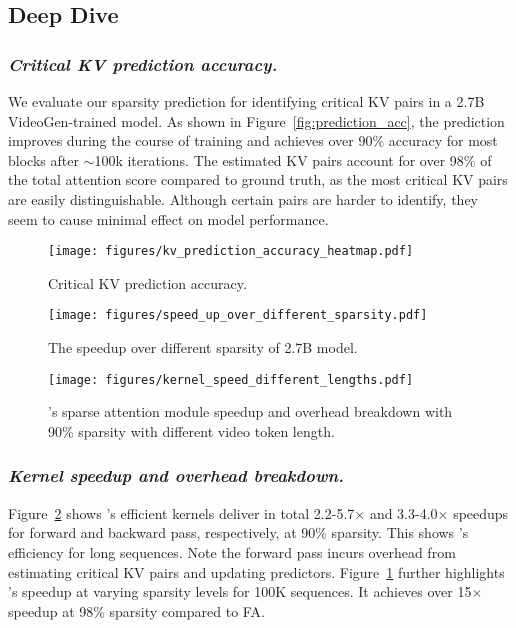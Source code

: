 \subsection{Deep Dive}


\subsubsection{\bf \em Critical KV prediction accuracy.} We evaluate our sparsity prediction for identifying critical KV pairs in a 2.7B VideoGen-trained model. As shown in Figure~\ref{fig:prediction_acc}, the prediction improves during the course of training and achieves over 90\% accuracy for most blocks after $\sim$100k iterations. 
The estimated KV pairs account for over 98\% of the total attention score compared to ground truth, as the most critical KV pairs are easily distinguishable. Although certain pairs are harder to identify, they seem to cause minimal effect on model performance.


\begin{figure}[t]
    \centering
    \begin{minipage}[t]{0.25\textwidth}
       \centering
  \texttt{[image: figures/kv\_prediction\_accuracy\_heatmap.pdf]}
\caption{Critical KV prediction accuracy.}
  \label{fig:prediction_acc} 
    \end{minipage}
    \hfill
    \hspace{-0.1in}
    \begin{minipage}[t]{0.215\textwidth}
      \centering
  \texttt{[image: figures/speed\_up\_over\_different\_sparsity.pdf]} 
  \caption{The speedup over different sparsity of 2.7B model.}
  \label{fig:speed_up_different_sparsity} 
    \end{minipage}
   
\end{figure}

\begin{figure}[t]
  \centering
  \texttt{[image: figures/kernel\_speed\_different\_lengths.pdf]} 
\caption{\sys's sparse attention module speedup and overhead breakdown with 90\% sparsity with different video token length. }
  \label{fig:kernel_speedup} 
\end{figure}





   



\subsubsection{\bf \em Kernel speedup and overhead breakdown.}
Figure~\ref{fig:kernel_speedup} shows \sys's efficient kernels deliver in total 2.2-5.7$\times$ and 3.3-4.0$\times$ speedups for forward and backward pass, respectively, at 90\% sparsity. This shows \sys's efficiency for long sequences.
Note the forward pass incurs overhead from estimating critical KV pairs and updating predictors.  
Figure~\ref{fig:speed_up_different_sparsity} further highlights \sys's speedup at varying sparsity levels for 100K sequences. It achieves over 15$\times$ speedup at 98\% sparsity compared to FA.

